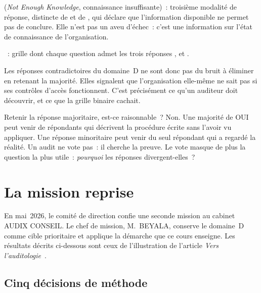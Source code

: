\begin{boxdef}
 (\textit{Not Enough Knowledge},
connaissance insuffisante)~: troisième modalité de réponse, distincte de
\OUI{} et de \NON{}, qui déclare que l'information disponible ne permet pas
de conclure. Elle n'est pas un aveu d'échec~: c'est une information sur
l'état de connaissance de l'organisation.

\medskip
{}~: grille
dont chaque question admet les trois réponses \OUI{}, \NON{} et \NEK{}.
\end{boxdef}

Les réponses contradictoires du domaine~D ne sont donc pas du bruit à
éliminer en retenant la majorité. Elles signalent que l'organisation
elle-même ne sait pas si ses contrôles d'accès fonctionnent. C'est
précisément ce qu'un auditeur doit découvrir, et ce que la grille binaire
cachait.

\begin{boiteRemarque}{Retenir la réponse majoritaire, est-ce raisonnable~?}
Non. Une majorité de OUI peut venir de répondants qui décrivent la
procédure écrite sans l'avoir vu appliquer. Une réponse minoritaire peut
venir du seul répondant qui a regardé la réalité. Un audit ne vote pas~: il
cherche la preuve. Le vote masque de plus la question la plus utile~:
\emph{pourquoi} les réponses divergent-elles~?
\end{boiteRemarque}

\section{La mission reprise}
\label{sec:pro-reprise}

En mai~2026, le comité de direction confie une seconde mission au cabinet
AUDIX CONSEIL. Le chef de mission, M.~BEYALA, conserve le domaine~D comme
cible prioritaire et applique la démarche que ce cours enseigne. Les
résultats décrits ci-dessous sont ceux de l'illustration de l'article
\emph{Vers l'auditologie}~\cite{minka2026auditologie}.

\subsection{Cinq décisions de méthode}

